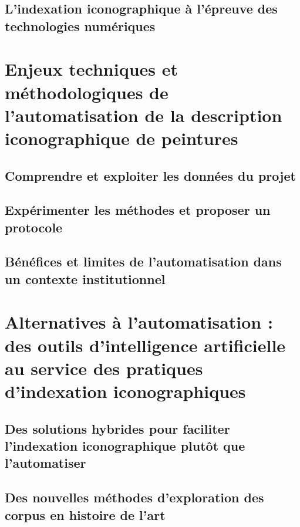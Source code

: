 \documentclass[12pt,twoside]{book}
\begin{document}
\chapter[Indexation et numérique]{L’indexation iconographique à l’épreuve des technologies numériques}


	\part{Enjeux techniques et méthodologiques de l’automatisation de la description iconographique de peintures}

\chapter[Les données du projet]{Comprendre et exploiter les données du projet}


\chapter[Expérimentations pour l'automatisation]{Expérimenter les méthodes et proposer un protocole}


\chapter[Bénéfices et limites de l'automatisation]{Bénéfices et limites de l’automatisation dans un contexte institutionnel}


	\part{Alternatives à l’automatisation : des outils d'intelligence artificielle au service des pratiques d'indexation iconographiques}

\chapter[Faciliter l'indexation]{Des solutions hybrides pour faciliter l’indexation iconographique plutôt que l’automatiser}


\chapter[Nouvelles méthodes d'exploration]{Des nouvelles méthodes d’exploration des corpus en histoire de l’art}

	
\end{document}
